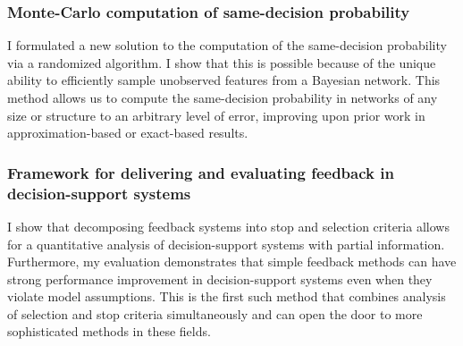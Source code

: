 \subsubsection{Monte-Carlo computation of same-decision probability}
I formulated a new solution to the computation of the same-decision probability via a randomized algorithm. I show that this is possible because of the unique ability to efficiently sample unobserved features from a Bayesian network. This method allows us to compute the same-decision probability in networks of any size or structure to an arbitrary level of error, improving upon prior work in approximation-based or exact-based results.

\subsubsection{Framework for delivering and evaluating feedback in decision-support systems}
I show that decomposing feedback systems into stop and selection criteria allows for a quantitative analysis of decision-support systems with partial information. Furthermore, my evaluation demonstrates that simple feedback methods can have strong performance improvement in decision-support systems even when they violate model assumptions. This is the first such method that combines analysis of selection and stop criteria simultaneously and can open the door to more sophisticated methods in these fields.